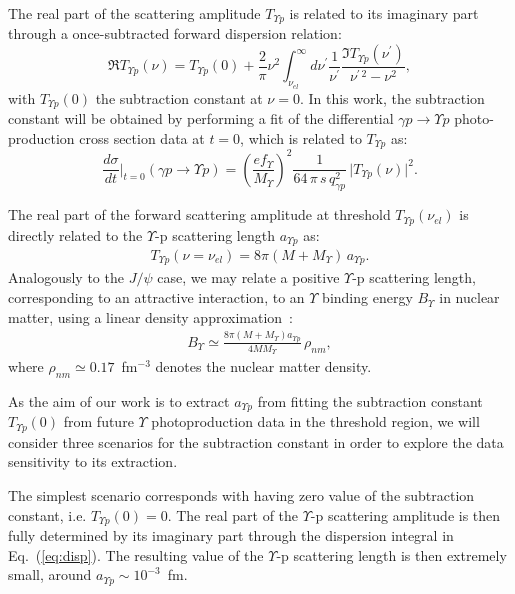 \documentclass[prd,amsmath,%
twocolumn,floatfix,amssymb, preprintnumbers, nofootinbib, superscriptaddress]{revtex4}
\newcommand{\beq}{\begin{equation}}
\newcommand{\eeq}{\end{equation}}
\newcommand{\bea}{\begin{eqnarray}}
\newcommand{\eea}{\end{eqnarray}}
\begin{document}
The real part of the scattering amplitude $T_{\Upsilon p}$ is related to its imaginary part
through a once-subtracted forward dispersion relation:
\beq
\Re T_{\Upsilon p}(\nu) = T_{\Upsilon p}(0) + \frac{2}{\pi} \nu^2 \int_{\nu_{el}}^\infty d
\nu^\prime \frac{1}{\nu^\prime} \frac{\Im T_{\Upsilon p}(\nu^\prime)}{\nu^{\prime \, 2} - \nu^2},
\label{eq:disp}
\eeq
with $T_{\Upsilon p}(0) $ the subtraction constant at $\nu = 0$. In this work, the subtraction constant will be obtained by performing a fit of the 
differential $\gamma p \to \Upsilon p$  photo-production cross section data at $t=0$, which is related to $T_{\Upsilon p}$ as:
\beq
\frac{d \sigma}{dt} \biggr|_{t = 0} (\gamma p \to \Upsilon p) 
= \left( \frac{e f_\Upsilon}{M_\Upsilon} \right)^2  \frac{1}{64 \, \pi \, s \, q_{\gamma p}^2} \, \big| T_{\Upsilon p}(\nu) \big|^2.
\label{eq:dsigmadt0_gapjpsip}
\eeq

The real part of the forward scattering amplitude at threshold $T_{\Upsilon p}(\nu_{el}) $ is directly related to the $\Upsilon$-p scattering length 
$a_{\Upsilon p}$ as:
\bea
T_{\Upsilon p}(\nu = \nu_{el}) = 8 \pi (M + M_\Upsilon) \, a_{\Upsilon p}. 
\eea
Analogously to the $J/\psi$ case, 
we may relate a positive $\Upsilon$-p scattering length, corresponding to an attractive interaction, 
to an $\Upsilon$ binding energy $B_\Upsilon$ in nuclear matter, using a linear density approximation~\cite{Kaidalov:1992hd}:
\begin{eqnarray}
B_\Upsilon \simeq \frac{8 \pi (M + M_\Upsilon) a_{\Upsilon p}}{4 M M_\Upsilon} \, \rho_{nm},
\label{eq:nmbe}
\end{eqnarray}
where $\rho_{nm} \simeq 0.17$~fm$^{-3}$ denotes the nuclear matter density.

As the aim of our work is to extract $a_{\Upsilon p}$ from fitting the subtraction constant $T_{\Upsilon p}(0)$ from future $\Upsilon$ photoproduction data in the threshold region, we will consider three scenarios for the subtraction constant in order to explore the data sensitivity to its extraction. 

The simplest scenario corresponds with having zero value of the subtraction constant, i.e. $T_{\Upsilon p}(0) = 0$. The real part of the $\Upsilon$-p  scattering amplitude is then fully determined by its imaginary part through the dispersion integral 
in Eq.~(\ref{eq:disp}). The resulting value of the $\Upsilon$-p scattering length is then extremely small, around $a_{\Upsilon p} \sim 10^{-3}$~fm. 
\end{document}
